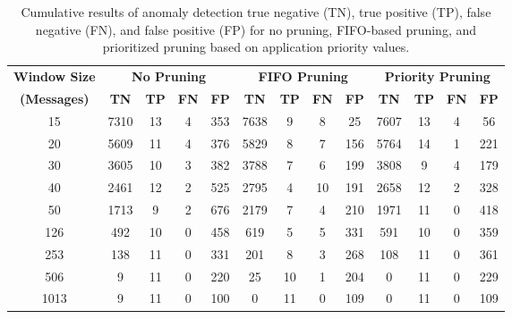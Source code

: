 \begin{table}[tb!] \centering

\caption{Cumulative results of anomaly detection true negative (TN), true positive (TP), false negative (FN), and false positive (FP) for no pruning, FIFO-based pruning, and prioritized pruning based on application priority values.}\label{tab:results}

\begin{tabular}{c|cccc|cccc|cccc}
\textbf{Window Size} & \multicolumn{4}{|c}{\bf No Pruning} & \multicolumn{4}{|c}{\bf FIFO Pruning} & \multicolumn{4}{|c}{\bf Priority Pruning} \\
\textbf{(Messages)} & \textbf{TN} & \textbf{TP} & \textbf{FN} & \textbf{FP} & \textbf{TN} & \textbf{TP} & \textbf{FN} & \textbf{FP} & \textbf{TN} & \textbf{TP} & \textbf{FN} & \textbf{FP}\\ \midrule
15 & 7310 & 13 & 4 & 353 & 7638 & 9 & 8 & 25  & 7607 & 13 & 4 & 56 \\ 
20 & 5609 & 11 & 4 & 376 & 5829 & 8 & 7 & 156  & 5764 & 14 & 1 & 221  \\ 
30 & 3605 & 10 & 3 & 382 & 3788 & 7 & 6 & 199 & 3808 & 9 & 4 & 179 \\ 
40 & 2461 & 12 & 2 & 525  & 2795 & 4 & 10 & 191  & 2658 & 12 & 2 & 328\\ 
50 & 1713 & 9 & 2 & 676 & 2179 & 7 & 4 & 210 & 1971 & 11 & 0 & 418\\ 
126 & 492 & 10 & 0 & 458 & 619 & 5 & 5 & 331 & 591 & 10 & 0 & 359 \\ 
253 & 138 & 11 & 0 & 331 & 201 & 8 & 3 & 268 & 108 & 11 & 0 & 361 \\ 
506 & 9 & 11 & 0 & 220  & 25 & 10 & 1 & 204 & 0 & 11 & 0 & 229 \\ 
1013 & 9 & 11 & 0 & 100 & 0 & 11 & 0 & 109 & 0 & 11 & 0 & 109 \\
\end{tabular}

\end{table}

